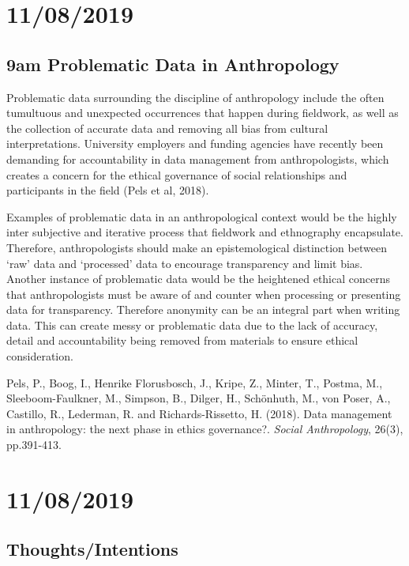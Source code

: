 \documentclass{article}
\begin{document}
\section{11/08/2019}

\subsection{9am Problematic Data in Anthropology}

Problematic data surrounding the discipline of anthropology include the often tumultuous and unexpected occurrences that happen during fieldwork, as well as the collection of accurate data and removing all bias from cultural interpretations. University employers and funding agencies have recently been demanding for accountability in data management from anthropologists, which creates a concern for the ethical governance of social relationships and participants in the field (Pels et al, 2018).



Examples of problematic data in an anthropological context would be the highly inter subjective and iterative process that fieldwork and ethnography encapsulate. Therefore, anthropologists should make an epistemological distinction between ‘raw’ data and ‘processed’ data to encourage transparency and limit bias. Another instance of problematic data would be the heightened ethical concerns that anthropologists must be aware of and counter when processing or presenting data for transparency. Therefore anonymity can be an integral part when writing data. This can create messy or problematic data due to the lack of accuracy, detail and accountability being removed from materials to ensure ethical consideration. 



Pels, P., Boog, I., Henrike Florusbosch, J., Kripe, Z., Minter, T., Postma, M., Sleeboom-Faulkner, M., Simpson, B., Dilger, H., Schönhuth, M., von Poser, A., Castillo, R., Lederman, R. and Richards-Rissetto, H. (2018). Data management in anthropology: the next phase in ethics governance?. \textit{Social Anthropology}, 26(3), pp.391-413.

\section{11/08/2019}

\subsection{Thoughts/Intentions}
\end{document}
